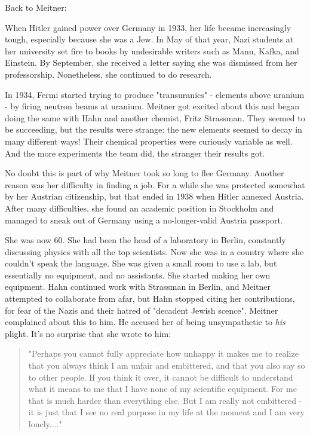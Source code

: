 Back to Meitner:

When Hitler gained power over Germany in 1933, her life became
increasingly tough, especially because she was a Jew.  In May of that
year, Nazi students at her university set fire to books by undesirable
writers such as Mann, Kafka, and Einstein.  By September, she received 
a letter saying she was dismissed from her professorship.  Nonetheless,
she continued to do research.  

In 1934, Fermi started trying to produce "transuranics" -
elements above uranium - by firing neutron beams at uranium.  Meitner
got excited about this and began doing the same with Hahn and another
chemist, Fritz Strassman.  They seemed to be succeeding, but the results
were strange: the new elements seemed to decay in many different ways!
Their chemical properties were curiously variable as well.  And the more
experiments the team did, the stranger their results got.

No doubt this is part of why Meitner took so long to flee Germany.
Another reason was her difficulty in finding a job.  For a while she was
protected somewhat by her Austrian citizenship, but that ended in 1938
when Hitler annexed Austria.  After many difficulties, she found an
academic position in Stockholm and managed to sneak out of Germany using
a no-longer-valid Austria passport.


She was now 60.  She had been the head of a laboratory in Berlin,
constantly discussing physics with all the top scientists.  Now she was
in a country where she couldn't speak the language.  She was given a
small room to use a lab, but essentially no equipment, and no
assistants.  She started making her own equipment.  Hahn continued work
with Strassman in Berlin, and Meitner attempted to collaborate from
afar, but Hahn stopped citing her contributions, for fear of the Nazis
and their hatred of "decadent Jewish scence".  Meitner
complained about this to him.  He accused her of being unsympathetic to
\emph{his} plight.  It's no surprise that she wrote to him:

\begin{quote}
 "Perhaps you cannot fully appreciate how unhappy it makes me to 
 realize that you always think I am unfair and embittered, and that 
 you also say so to other people.  If you think it over, it cannot 
 be difficult to understand what it means to me that I have none of 
 my scientific equipment.  For me that is much harder than everything 
 else.  But I am really not embittered - it is just that I see no real 
 purpose in my life at the moment and I am very lonely...."

\end{quote}


